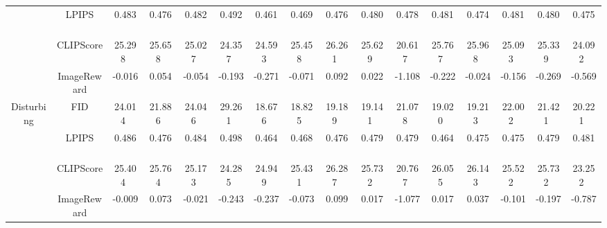 \begin{table*}
{\begin{tabular}{c|c|c|c|c|c|c|c|c|c|c|c|c|c|c|c}
\cline{2-16}
                                                                            & LPIPS           & 0.483~         & 0.476~           & 0.482~           & 0.492~           & 0.461~         & 0.469~         & 0.476~       & 0.480~       & 0.478~      & 0.481~      & 0.474~       & 0.481~         & 0.480~         & 0.475~         \\ 
\cline{2-16}
                                                                            & CLIPScore       & 25.298~        & 25.658~          & 25.027~          & 24.357~          & 24.593~        & 25.458~        & 26.261~      & 25.629~      & 20.617~     & 25.767~     & 25.968~      & 25.093~        & 25.339~        & 24.092~        \\ 
\cline{2-16}
                                                                            & ImageReward     & -0.016~        & 0.054~           & -0.054~          & -0.193~          & -0.271~        & -0.071~        & 0.092~       & 0.022~       & -1.108~     & -0.222~     & -0.024~      & -0.156~        & -0.269~        & -0.569~        \\ 
\hline
\multirow{4}{*}{Disturbing}                                                 & FID             & 24.014~        & 21.886~          & 24.046~          & 29.261~          & 18.676~        & 18.825~        & 19.189~      & 19.141~      & 21.078~     & 19.020~     & 19.213~      & 22.002~        & 21.421~        & 20.221~        \\ 
\cline{2-16}
                                                                            & LPIPS           & 0.486~         & 0.476~           & 0.484~           & 0.498~           & 0.464~         & 0.468~         & 0.476~       & 0.479~       & 0.479~      & 0.464~      & 0.475~       & 0.475~         & 0.479~         & 0.481~         \\ 
\cline{2-16}
                                                                            & CLIPScore       & 25.404~        & 25.764~          & 25.173~          & 24.285~          & 24.949~        & 25.431~        & 26.287~      & 25.732~      & 20.767~     & 26.055~     & 26.143~      & 25.522~        & 25.732~        & 23.252~        \\ 
\cline{2-16}
                                                                            & ImageReward     & -0.009~        & 0.073~           & -0.021~          & -0.243~          & -0.237~        & -0.073~        & 0.099~       & 0.017~       & -1.077~     & 0.017~      & 0.037~       & -0.101~        & -0.197~        & -0.787~        \\ 

\end{tabular}}
\end{table*}
